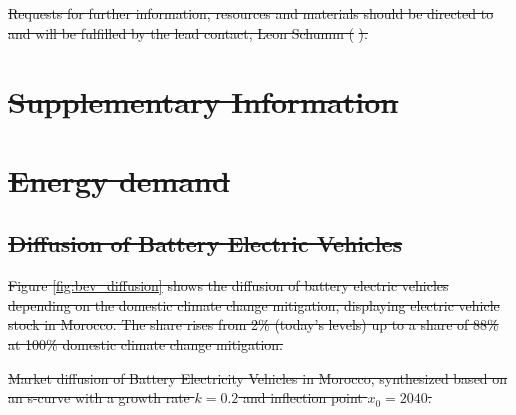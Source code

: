 \documentclass[5p,numafflabel]{elsarticle}
\providecommand{\DIFdeltex}[1]{{\protect\color{red}\sout{#1}}}                      %
\providecommand{\DIFdelFL}[1]{\DIFdel{#1}} %
\providecommand{\DIFdel}[1]{\texorpdfstring{\DIFdeltex{#1}}{}} %
\begin{document}
\DIFdel{Requests for further information, resources and materials should be directed to and will be fulfilled by the lead contact, Leon Schumm
(}%
\DIFdel{).
}%




\section*{\DIFdel{Supplementary Information}}

\section{\DIFdel{Energy demand}}
\addtocounter{section}{-1}%

\subsection{\DIFdel{Diffusion of Battery Electric Vehicles}}
\addtocounter{subsection}{-1}%
\DIFdel{Figure \ref{fig:bev_diffusion} shows the diffusion of battery electric vehicles depending on the domestic climate change mitigation, displaying electric vehicle stock in Morocco. The share rises from 2\% (today's levels) up to a share of 88\% at 100\% domestic climate change mitigation. %
}%

{%
\DIFdelFL{Market diffusion of Battery Electricity Vehicles in Morocco, synthesized based on an s-curve with a growth rate $k=0.2$ and inflection point $x_0=2040$.}}
\end{document}
